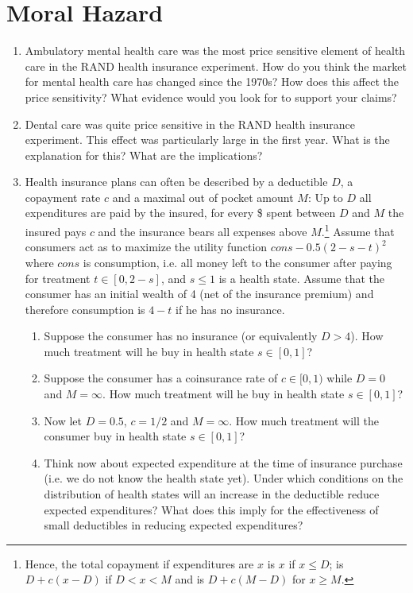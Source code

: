 \documentclass[a4paper]{article}
\begin{document}
\section{Moral Hazard}
\label{sec:orga02ced4}

\begin{enumerate}[resume]
\item Ambulatory mental health care was the most price sensitive element of health care in the RAND health insurance experiment. How do you think the market for mental health care has changed since the 1970s? How does this affect the price sensitivity? What evidence would you look for to support your claims?

\item Dental care was quite price sensitive in the RAND health insurance experiment. This effect was particularly large in the first year. What is the explanation for this? What are the implications?

\item Health insurance plans can often be described by a deductible \(D\), a copayment rate \(c\) and a maximal out of pocket amount \(M\): Up to \(D\) all expenditures are paid by the insured, for every \$ spent between \(D\) and \(M\) the insured pays \(c\) and the insurance bears all expenses above \(M\).\footnote{Hence, the total copayment if expenditures are \(x\) is \(x\) if \(x\leq D\); is \(D+c(x-D)\) if \(D<x<M\) and is \(D+c(M-D)\) for \(x\geq M\).} Assume that consumers act as to maximize the utility function \(cons-0.5(2-s-t)^2\) where \(cons\) is consumption, i.e. all money left to the consumer after paying for treatment \(t\in[0,2-s]\), and \(s\leq1\) is a health state. Assume that the consumer has an initial wealth of 4 (net of the insurance premium) and therefore consumption is \(4-t\) if he has no insurance.
\begin{enumerate}
\item Suppose the consumer has no insurance (or equivalently \(D>4\)). How much treatment will he buy in health state \(s\in[0,1]\)?
\item Suppose the consumer has a coinsurance rate of \(c\in[0,1)\) while \(D=0\) and \(M=\infty\). How much treatment will he buy in health state \(s\in[0,1]\)?
\item Now let \(D=0.5\), \(c=1/2\) and \(M=\infty\). How much treatment will the consumer buy in health state \(s\in[0,1]\)?
\item Think now about expected expenditure at the time of insurance purchase (i.e. we do not know the health state yet). Under which conditions on the distribution of health states will an increase in the deductible reduce expected expenditures? What does this imply for the effectiveness of small deductibles in reducing expected expenditures?
\end{enumerate}


\end{enumerate}
\end{document}
